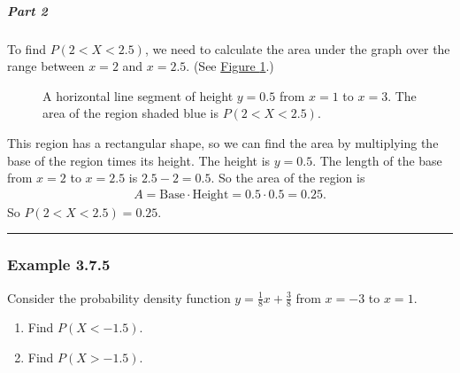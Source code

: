 \documentclass[letterpaper,10pt,english]{jupyterBook}
\begin{document}
\subparagraph{Part 2}
\label{\detokenize{Ch3 Probability/3.7 Continuous Probability Distributions:part-2}}
\sphinxAtStartPar
To find \(P(2 < X < 2.5)\), we need to calculate the area under the graph over the range between \(x = 2\) and \(x = 2.5\). (See \hyperref[\detokenize{Ch3 Probability/3.7 Continuous Probability Distributions:pdf-rect2-area2}]{Figure \ref{\detokenize{Ch3 Probability/3.7 Continuous Probability Distributions:pdf-rect2-area2}}}.)

\begin{figure}[htbp]
\centering
\capstart

\noindent{}
\caption{A horizontal line segment of height \(y = 0.5\) from \(x = 1\) to \(x = 3\). The area of the region shaded blue is \(P(2 < X < 2.5)\).}\label{\detokenize{Ch3 Probability/3.7 Continuous Probability Distributions:pdf-rect2-area2}}\end{figure}

\sphinxAtStartPar
This region has a rectangular shape, so we can find the area by multiplying the base of the region times its height. The height is \(y = 0.5\). The length of the base from \(x = 2\) to \(x = 2.5\) is \(2.5 - 2 = 0.5\). So the area of the region is
\begin{equation*}
\begin{split} A = \text{Base} \cdot \text{Height} = 0.5 \cdot 0.5 = 0.25. \end{split}
\end{equation*}
\sphinxAtStartPar
So \(P(2 < X < 2.5) = 0.25\).


\bigskip\hrule\bigskip



\subsubsection{Example 3.7.5}
\label{\detokenize{Ch3 Probability/3.7 Continuous Probability Distributions:example-3-7-5}}
\sphinxAtStartPar
Consider the probability density function \(y = \frac{1}{8}x + \frac{3}{8}\) from \(x = -3\) to \(x = 1\).
\begin{enumerate}
%
\item {} 
\sphinxAtStartPar
Find \(P(X < -1.5)\).

\item {} 
\sphinxAtStartPar
Find \(P(X > -1.5)\).

\end{enumerate}
\end{document}

